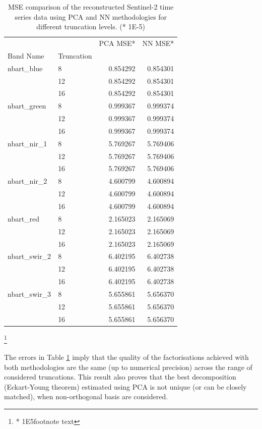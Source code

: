 \documentclass[essd, manuscript]{copernicus}
\begin{document}
\begin{table}
\centering
\begin{tabular}{|l|l|r|r|}
\toprule
\hline
             &    &   PCA MSE* &    NN MSE* \\
Band Name & Truncation &           &           \\
\midrule
\hline\hline
nbart\_blue & 8  &  0.854292 &  0.854301 \\
             & 12 &  0.854292 &  0.854301 \\
             & 16 &  0.854292 &  0.854301 \\
\hline
nbart\_green & 8  &  0.999367 &  0.999374 \\
             & 12 &  0.999367 &  0.999374 \\
             & 16 &  0.999367 &  0.999374 \\
\hline
nbart\_nir\_1 & 8  &  5.769267 &  5.769406 \\
             & 12 &  5.769267 &  5.769406 \\
             & 16 &  5.769267 &  5.769406 \\
\hline
nbart\_nir\_2 & 8  &  4.600799 &  4.600894 \\
             & 12 &  4.600799 &  4.600894 \\
             & 16 &  4.600799 &  4.600894 \\
\hline
nbart\_red & 8  &  2.165023 &  2.165069 \\
             & 12 &  2.165023 &  2.165069 \\
             & 16 &  2.165023 &  2.165069 \\
\hline
nbart\_swir\_2 & 8  &  6.402195 &  6.402738 \\
             & 12 &  6.402195 &  6.402738 \\
             & 16 &  6.402195 &  6.402738 \\
\hline
nbart\_swir\_3 & 8  &  5.655861 &  5.656370 \\
             & 12 &  5.655861 &  5.656370 \\
             & 16 &  5.655861 &  5.656370 \\
\bottomrule
\hline
\end{tabular}
\caption{MSE comparison of the reconstructed Sentinel-2 time series data using PCA and NN methodologies for different truncation levels. (* 1E-5)}
\footnote{* 1E5footnote text}
\label{components_error}
\end{table}

The errors in Table \ref{components_error} imply that the quality of the factorisations achieved with both methodologies are the same (up to numerical precision) across the range of considered truncations. This result also proves that the best decomposition (Eckart-Young theorem) estimated using PCA is not unique (or can be closely matched), when non-orthogonal basis are considered.
\end{document}
